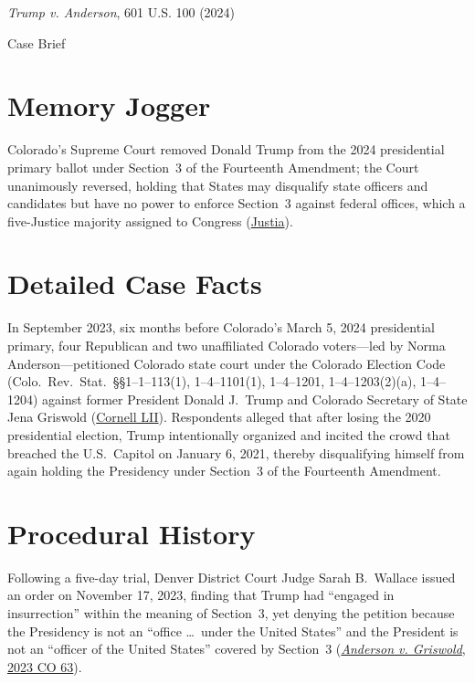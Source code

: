 \documentclass[12pt]{article}
\begin{document}
\begin{center}
{\LARGE \textit{Trump v. Anderson}, 601 U.S. 100 (2024)\par}
\vspace{0.8em}
{\large Case Brief\par}
\end{center}
\vspace{1em}

\section{Memory Jogger}
Colorado's Supreme Court removed Donald Trump from the 2024 presidential primary ballot under Section~3 of the Fourteenth Amendment; the Court unanimously reversed, holding that States may disqualify state officers and candidates but have no power to enforce Section~3 against federal offices, which a five-Justice majority assigned to Congress (\href{https://supreme.justia.com/cases/federal/us/601/23-719/}{Justia}).

\section{Detailed Case Facts}
In September 2023, six months before Colorado's March 5, 2024 presidential primary, four Republican and two unaffiliated Colorado voters---led by Norma Anderson---petitioned Colorado state court under the Colorado Election Code (Colo.\ Rev.\ Stat.\ \S\S 1--1--113(1), 1--4--1101(1), 1--4--1201, 1--4--1203(2)(a), 1--4--1204) against former President Donald J.\ Trump and Colorado Secretary of State Jena Griswold (\href{https://www.law.cornell.edu/supremecourt/text/23-719}{Cornell LII}). Respondents alleged that after losing the 2020 presidential election, Trump intentionally organized and incited the crowd that breached the U.S.\ Capitol on January 6, 2021, thereby disqualifying himself from again holding the Presidency under Section~3 of the Fourteenth Amendment.

\section{Procedural History}
Following a five-day trial, Denver District Court Judge Sarah B.\ Wallace issued an order on November 17, 2023, finding that Trump had ``engaged in insurrection'' within the meaning of Section~3, yet denying the petition because the Presidency is not an ``office \ldots\ under the United States'' and the President is not an ``officer of the United States'' covered by Section~3 (\href{https://law.justia.com/cases/colorado/supreme-court/2023/23sa300.html}{\emph{Anderson v. Griswold}, 2023 CO 63}).
\end{document}
